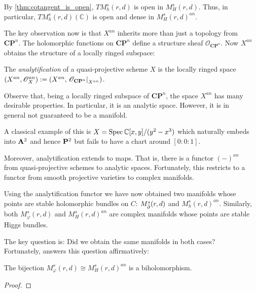 \documentclass[12pt]{ociamthesis}  %
\begin{document}
\begin{example}
  By \ref{thm:cotangent_is_open}, $TM_h^s(r,d)$ is open in $M_H^s(r,d)$. Thus,
  in particular, $TM_h^s(r,d)(\mathbb C)$ is open and dense in $M^s_H(r,d)^{an}$.
\end{example}

The key observation now is that $X^{an}$ inherits more than just a
topology from $\mathbf{CP}^n$. The holomorphic functions on $\mathbf{CP}^n$
define a structure sheaf $\mathscr O_{\mathbf{CP}^n}$. Now $X^{an}$
obtains the structure of a locally ringed subspace:

\begin{definition}
  The \emph{analytification} of a quasi-projective scheme $X$
  is the locally ringed space
  $(X^{an},\mathscr O_X^{an}) := (X^{an},\left.{\mathscr O_{\mathbf{CP}^n}}\right\vert_{X^{an}})$.
\end{definition}

Observe that, being a locally ringed subspace of $\mathbf{CP}^n$,
the space $X^{an}$ has many desirable properties. In particular, it is
an analytic space. However, it is in general not guaranteed to
be a manifold.

\begin{example}
  A classical example of this is $X=\operatorname{Spec} \mathbb C[x,y]/(y^2-x^3)$
  which naturally embeds into $\mathbf{A}^{2}_{}$ and hence $\mathbf{P}^{2}_{}$
  but fails to have a chart around $[0:0:1]$.
\end{example}

Moreover, analytification extends to maps. That is, there is a
functor $(-)^{an}$ from quasi-projective schemes to analytic spaces.
Fortunately, this restricts to a functor from smooth projective varieties
to complex manifolds.

Using the analytification functor we have now obtained two
manifolds whose points are stable holomorphic bundles on $C$:
$M^s_{\bar{\partial}}(r,d)$ and $M^s_h(r,d)^{an}$. Similarly,
both $M^s_\varphi(r,d)$ and $M^s_H(r,d)^{an}$ are complex manifolds
whose points are stable Higgs bundles.

The key question is: Did we obtain the same manifolds in both cases?
Fortunately, \cite[Theorem C]{fan2020} answers this question affirmatively:

\begin{theorem}
  The bijection
  $M^s_\varphi(r,d) \cong M^s_H(r,d)^{an}$
  is a biholomorphism.
  \begin{proof}
    \missingproof
  \end{proof}
\end{theorem}
\end{document}
